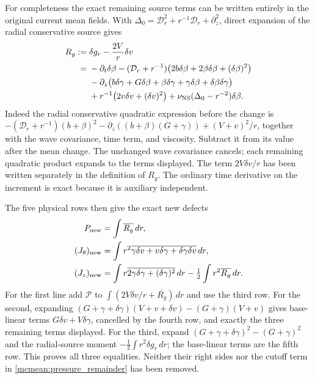 For completeness the exact remaining source terms can be written
entirely in the original current mean fields. With
\(\Delta_0=\mathcal D_r^2+r^{-1}\mathcal D_r+\partial_z^2\),
direct expansion of the radial conservative source gives
\begin{equation}\label{mcmean:Rg}
\begin{split}
 R_g:={}&\delta g_r-\frac{2V}{r}\delta v\\
 ={}&-\partial_t\delta\beta
 -(\mathcal D_r+r^{-1})
       \bigl(2b\delta\beta+2\beta\delta\beta+(\delta\beta)^2\bigr)\\
 &-\partial_z\bigl(b\delta\gamma+G\delta\beta+
       \beta\delta\gamma+\gamma\delta\beta+
       \delta\beta\delta\gamma\bigr)\\
 &+r^{-1}\bigl(2v\delta v+(\delta v)^2\bigr)
       +\nu_{\rm NS}(\Delta_0-r^{-2})\delta\beta.
\end{split}
\end{equation}
Indeed the radial conservative quadratic expression before the change
is \(-(\mathcal D_r+r^{-1})(b+\beta)^2
-\partial_z((b+\beta)(G+\gamma))+(V+v)^2/r\), together with
the wave covariance, time term, and viscosity. Subtract it from its
value after the mean change. The unchanged wave covariance cancels;
each remaining quadratic product expands to the terms displayed.
The term \(2V\delta v/r\) has been written separately in the
definition of \(R_g\). The ordinary time derivative on the increment
is exact because it is auxiliary independent.

The five physical rows then give the exact new defects
\begin{equation}\label{mcmean:nonlinear_defects}
\begin{split}
 P_{\rm new}&=\int\overline{R_g}\,dr,\\
 (J_\theta)_{\rm new}
   &=\int r^2\overline{\gamma\delta v+v\delta\gamma+
                                    \delta\gamma\delta v}\,dr,\\
 (J_z)_{\rm new}
   &=\int r\overline{2\gamma\delta\gamma+(\delta\gamma)^2}\,dr
                        -\tfrac12\int r^2\overline{R_g}\,dr.
\end{split}
\end{equation}
For the first line add \(\mathcal P\) to
\(\int(2V\delta v/r+\overline{R_g})\,dr\) and use the third
row. For the second, expanding \((G+\gamma+\delta\gamma)
(V+v+\delta v)-(G+\gamma)(V+v)\) gives base-linear terms
\(G\delta v+V\delta\gamma\), cancelled by the fourth row, and
exactly the three remaining terms displayed. For the third, expand
\((G+\gamma+\delta\gamma)^2-(G+\gamma)^2\) and the radial-source
moment \(-\tfrac12\int r^2\delta g_r\,dr\); the base-linear
terms are the fifth row. This proves all three equalities.
Neither their right sides nor the cutoff term in
\eqref{mcmean:pressure_remainder} has been removed.

